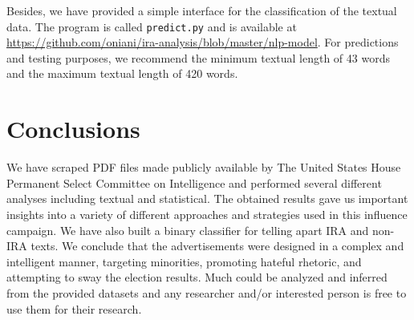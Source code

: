 \documentclass{article}
\begin{document}
Besides, we have provided a simple interface for the classification of the
textual data. The program is called \texttt{predict.py} and is available at
\url{https://github.com/oniani/ira-analysis/blob/master/nlp-model}. For
predictions and testing purposes, we recommend the minimum textual length of
43 words and the maximum textual length of 420 words.


\section{Conclusions}

We have scraped PDF files made publicly available by The United States House
Permanent Select Committee on Intelligence and performed several different
analyses including textual and statistical. The obtained results gave us
important insights into a variety of different approaches and strategies used
in this influence campaign. We have also built a binary classifier for telling
apart IRA and non-IRA texts. We conclude that the advertisements were designed
in a complex and intelligent manner, targeting minorities, promoting hateful
rhetoric, and attempting to sway the election results. Much could be analyzed
and inferred from the provided datasets and any researcher and/or interested
person is free to use them for their research.


\printbibliography

\end{document}
